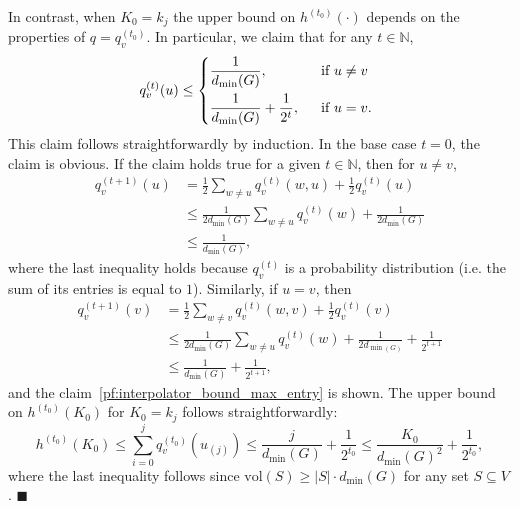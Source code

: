 \documentclass[twoside,11pt]{article}
\newcommand{\1}{\mathbf{1}}
\newcommand{\vol}{\mathrm{vol}}
\newcommand{\qed}{\hfill $\blacksquare$}
\begin{document}
In contrast, when $K_0 = k_j$ the upper bound on $h^{(t_0)}(\cdot)$ depends on the properties of $q = q_v^{(t_0)}$. In particular, we claim that for any $t \in \mathbb{N}$,
\begin{equation}
\label{pf:interpolator_bound_max_entry}
q_v^{(t)}(u) \leq
\begin{dcases*}
\frac{1}{d_{\min}(G)},& ~~\textrm{if $u \neq v$} \\
\frac{1}{d_{\min}(G)} + \frac{1}{2^t},& ~~\textrm{if $u = v$.}
\end{dcases*}
\end{equation}
This claim follows straightforwardly by induction. In the base case $t = 0$, the claim is obvious. If the claim holds true for a given $t \in \mathbb{N}$, then for $u \neq v$,
\begin{equation}
\label{pf:interpolator_bound_max_entry_inductive_step}
\begin{aligned}
q_v^{(t + 1)}(u) & = \frac{1}{2}\sum_{w \neq u}q_v^{(t)}(w,u)  + \frac{1}{2}q_v^{(t)}(u) \\
& \leq \frac{1}{2d_{\min}(G)}\sum_{w \neq u}q_v^{(t)}(w)  + \frac{1}{2d_{\min}(G)} \\
& \leq \frac{1}{d_{\min}(G)},
\end{aligned}
\end{equation}
where the last inequality holds because $q_v^{(t)}$ is a probability distribution (i.e. the sum of its entries is equal to $1$). Similarly, if $u = v$, then
\begin{align*}
q_v^{(t + 1)}(v) & = \frac{1}{2}\sum_{w \neq v}q_v^{(t)}(w,v)  + \frac{1}{2}q_v^{(t)}(v) \\
& \leq \frac{1}{2d_{\min}(G)}\sum_{w \neq u}q_v^{(t)}(w)  + \frac{1}{2d_{\min(G)}} + \frac{1}{2^{t + 1}} \\
& \leq \frac{1}{d_{\min}(G)} + \frac{1}{2^{t + 1}},
\end{align*}
and the claim~\eqref{pf:interpolator_bound_max_entry} is shown. The upper bound on $h^{(t_0)}(K_0)$ for $K_0 = k_j$ follows straightforwardly:
\begin{equation*}
h^{(t_0)}(K_0) \leq \sum_{i = 0}^{j} q_v^{(t_0)}(u_{(j)}) \leq \frac{j}{d_{\min}(G)} + \frac{1}{2^{t_0}} \leq \frac{K_0}{d_{\min}(G)^2} + \frac{1}{2^{t_0}},
\end{equation*}
where the last inequality follows since $\vol(S) \geq |S| \cdot d_{\min}(G)$ for any set $S \subseteq V$. \qed \\
\end{document}
